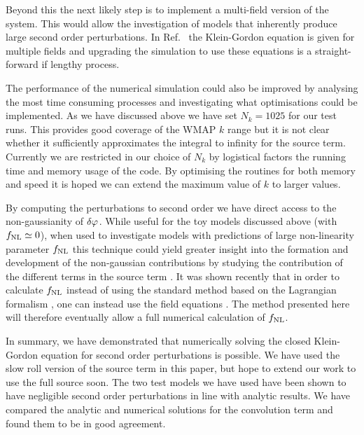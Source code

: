 Beyond this the next likely step is to implement a multi-field version of the
system. This would allow the investigation of models that inherently
produce large second order perturbations. In Ref.~\cite{Malik:2006ir} the
Klein-Gordon equation is given for multiple fields and upgrading the
simulation to use these equations is a
straight-forward if lengthy process.  


The performance of the numerical simulation could also be improved by
analysing the most time consuming processes and investigating what
optimisations could be implemented. As we have discussed above we have
set $N_k=1025$ for our test runs. This provides good coverage of the
WMAP $k$ range but it is not clear whether it sufficiently
approximates the integral to infinity for the source term.  Currently
we are restricted in our choice of $N_k$ by logistical factors \ie the
running time and memory usage of the code. By optimising the routines
for both memory and speed it is hoped we can extend the maximum value
of $k$ to larger values.


By computing the perturbations to second order we have direct access
to the non-gaussianity of $\delta\varphi_{}$.  While useful for the toy models
discussed above (with $f_{\mathrm{NL}}\simeq0$), when used to investigate models
with predictions of large non-linearity parameter $f_{\mathrm{NL}}$ this technique
could yield greater insight into the formation and development of the
non-gaussian contributions by studying the contribution of the different
terms in the source term .
%
It was shown recently that in order to calculate $f_{\mathrm{NL}}$ instead of
using the standard method based on the Lagrangian formalism
\cite{Maldacena:2002vr}, one can instead use the field equations
\cite{Musso:2006pt,Seery:2008qj}. The method presented here will
therefore eventually allow a full numerical calculation of $f_{\mathrm{NL}}$.


In summary, we have demonstrated that numerically solving the closed
Klein-Gordon equation for second order perturbations is possible. We
have used the slow roll version of the source term in this paper, but
hope to extend our work to use the full source soon. The two test
models we have used have been shown to have negligible second order
perturbations in line with analytic results. We have compared the
analytic and numerical solutions for the convolution term and found
them to be in good agreement.
